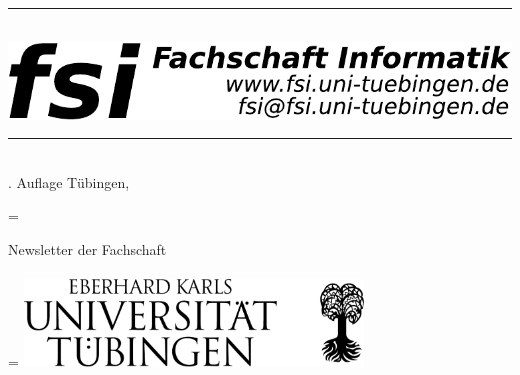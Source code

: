 \thispagestyle{empty}
\rule[2mm]{\textwidth}{.2cm}\\
\includegraphics[width=\textwidth]{logos/fsilogo}

\rule{\textwidth}{0.2cm}\\
{\sf \number\auflage. Auf\/lage \hfill Tübingen, \Month\space \number\jahr}\\

\vspace*{2cm}
\begin{center}
\oldbaselineskp=\baselineskip
\baselineskip 45pt

\Huge Newsletter der Fachschaft\\[2cm]


\LARGE \Month \space \number\jahr
\\

\baselineskip=\oldbaselineskp
\vfill
\includegraphics[width=9cm]{logos/unilogo_neu}
\end{center}
\eject